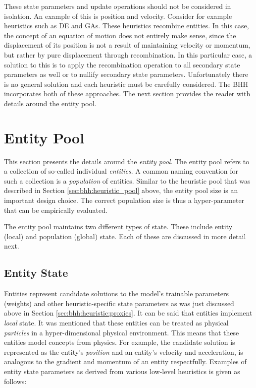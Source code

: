 These state parameters and update operations should not be considered in isolation. An example of this is position and velocity. Consider for example heuristics such as \acl{DE} and \aclp{GA}. These heuristics recombine entities. In this case, the concept of an equation of motion does not entirely make sense, since the displacement of its position is not a result of maintaining velocity or momentum, but rather by pure displacement through recombination. In this particular case, a solution to this is to apply the recombination operation to all secondary state parameters as well or to nullify secondary state parameters. Unfortunately there is no general solution and each heuristic must be carefully considered. The \ac{BHH} incorporates both of these approaches. The next section provides the reader with details around the entity pool.

\section{Entity Pool}
\label{sec:bhh:entity_pool}

This section presents the details around the \textit{entity pool}. The entity pool refers to a collection of so-called individual \textit{entities}. A common naming convention for such a collection is a \textit{population} of entities. Similar to the heuristic pool that was described in Section \ref{sec:bhh:heuristic_pool} above, the entity pool size is an important design choice. The correct population size is thus a hyper-parameter that can be empirically evaluated.

The entity pool maintains two different types of state. These include entity (local) and population (global) state. Each of these are discussed in more detail next.

\subsection{Entity State}
\label{sec:bhh:entity_pool:entity_state}

Entities represent candidate solutions to the model's trainable parameters (weights) and other heuristic-specific state parameters as was just discussed above in Section \ref{sec:bhh:heuristic:proxies}. It can be said that entities implement \textit{local} state. It was mentioned that these entities can be treated as physical \textit{particles} in a hyper-dimensional physical environment. This means that these entities model concepts from physics. For example, the candidate solution is represented as the entity's \textit{position} and an entity's velocity and acceleration, is analogous to the gradient and momentum of an entity respectfully. Examples of entity state parameters as derived from various low-level heuristics is given as follows:

